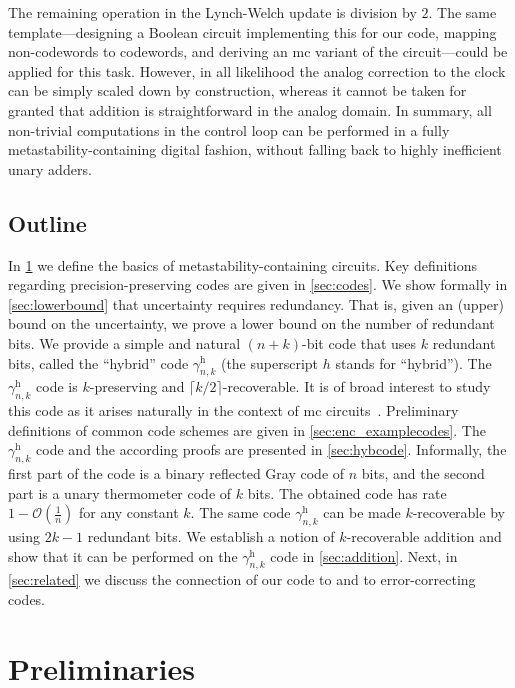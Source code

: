 \documentclass[9pt,journal,compsoc]{IEEEtran}
\theoremstyle{remark}
\newcommand{\ceil}[1]{\lceil{#1}\rceil}
\newcommand{\gHyb}[1]{\gamma_{#1}^{\operatorname{h}}}
\newcommand{\BO}{\mathcal{O}}
\begin{document}
The remaining operation in the Lynch-Welch update is division by $2$.
The same template---designing a Boolean circuit implementing this for our code, mapping non-codewords to codewords, and deriving an mc variant of the circuit---could be applied for this task.
However, in all likelihood the analog correction to the clock can be simply scaled down by construction, whereas it cannot be taken for granted that addition is straightforward in the analog domain.
In summary, all non-trivial
computations in the control loop can be
performed in a fully metastability-containing digital fashion, without
falling back to highly inefficient unary adders.

%
\subsection{Outline}

In \cref{sec:prelim} we define the basics of metastability-containing circuits.
Key definitions regarding precision-preserving codes are given in \cref{sec:codes}.
We show formally in \cref{sec:lowerbound} that uncertainty requires redundancy.
That is, given an (upper) bound on the uncertainty, we prove a lower
  bound on the number of redundant bits.
We provide a simple and natural $(n+k)$-bit code that uses $k$ redundant bits,
  called the ``hybrid'' code $\gHyb{n,k}$ %
  (the superscript $h$ stands for ``hybrid''). 
The $\gHyb{n,k}$ code is $k$-preserving and $\ceil{k/2}$-recoverable.
It is of broad interest to study this code as it arises naturally in the
  context of mc circuits~\cite{fuegger17aware}.
Preliminary definitions of common code schemes are given in \cref{sec:enc_examplecodes}.
The $\gHyb{n,k}$ code and the according proofs are presented in \cref{sec:hybcode}.
Informally, the first part of the code is a binary reflected Gray code of $n$ bits,
  and the second part is a unary thermometer code of $k$ bits.
The obtained code has rate $1-\BO\left(\frac{1}{n}\right)$
  for any constant $k$.
The same code $\gHyb{n,k}$ can be made $k$-recoverable by using $2k-1$ redundant
  bits.
We establish a notion of $k$-recoverable addition and show that it can be performed
  on the $\gHyb{n,k}$ code in \cref{sec:addition}.
Next, in \cref{sec:related} we discuss the connection of our code to \cite{fuegger17aware} and to error-correcting codes.

\section{Preliminaries}\label{sec:prelim}
\end{document}
